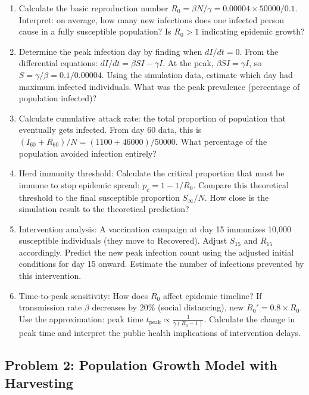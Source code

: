 \documentclass[12pt]{article}
\begin{document}
\begin{enumerate}[label=(\alph*)]
\item Calculate the basic reproduction number $R_0 = \beta N / \gamma = 0.00004 \times 50000 / 0.1$. Interpret: on average, how many new infections does one infected person cause in a fully susceptible population? Is $R_0 > 1$ indicating epidemic growth?

\item Determine the peak infection day by finding when $dI/dt = 0$. From the differential equations: $dI/dt = \beta SI - \gamma I$. At the peak, $\beta SI = \gamma I$, so $S = \gamma/\beta = 0.1/0.00004$. Using the simulation data, estimate which day had maximum infected individuals. What was the peak prevalence (percentage of population infected)?

\item Calculate cumulative attack rate: the total proportion of population that eventually gets infected. From day 60 data, this is $(I_{60} + R_{60})/N = (1100 + 46000)/50000$. What percentage of the population avoided infection entirely?

\item Herd immunity threshold: Calculate the critical proportion that must be immune to stop epidemic spread: $p_c = 1 - 1/R_0$. Compare this theoretical threshold to the final susceptible proportion $S_{\infty}/N$. How close is the simulation result to the theoretical prediction?

\item Intervention analysis: A vaccination campaign at day 15 immunizes 10,000 susceptible individuals (they move to Recovered). Adjust $S_{15}$ and $R_{15}$ accordingly. Predict the new peak infection count using the adjusted initial conditions for day 15 onward. Estimate the number of infections prevented by this intervention.

\item Time-to-peak sensitivity: How does $R_0$ affect epidemic timeline? If transmission rate $\beta$ decreases by 20\% (social distancing), new $R_0' = 0.8 \times R_0$. Use the approximation: peak time $t_{\text{peak}} \propto \frac{1}{\gamma(R_0 - 1)}$. Calculate the change in peak time and interpret the public health implications of intervention delays.
\end{enumerate}

\subsection*{Problem 2: Population Growth Model with Harvesting}
\end{document}
